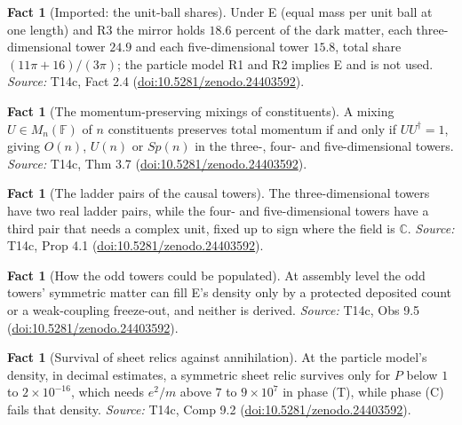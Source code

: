 \documentclass[11pt]{article}
\theoremstyle{definition}
\newtheorem{fact}[theorem]{Fact}
\theoremstyle{plain}
\providecommand{\C}{}\renewcommand{\C}{\mathbb{C}}
\providecommand{\F}{}\renewcommand{\F}{\mathbb{F}}
\begin{document}
\begin{fact}[Imported: the unit-ball shares]\label{c:dark-tower-matter.imported-unit-ball-rule}
Under E (equal mass per unit ball at one length) and R3 the mirror holds $18.6$ percent of the dark matter, each three-dimensional tower $24.9$ and each five-dimensional tower $15.8$, total share $(11\pi + 16)/(3\pi)$; the particle model R1 and R2 implies E and is not used.
\emph{Source:} T14c, Fact 2.4 (\href{https://doi.org/10.5281/zenodo.24403592}{doi:10.5281/zenodo.24403592}).
\end{fact}

\begin{fact}[The momentum-preserving mixings of constituents]\label{c:dark-tower-matter.ladder}
A mixing $U \in M_n(\F)$ of $n$ constituents preserves total momentum if and only if $UU^\dagger = 1$, giving $O(n)$, $U(n)$ or $Sp(n)$ in the three-, four- and five-dimensional towers.
\emph{Source:} T14c, Thm 3.7 (\href{https://doi.org/10.5281/zenodo.24403592}{doi:10.5281/zenodo.24403592}).
\end{fact}

\begin{fact}[The ladder pairs of the causal towers]\label{c:dark-tower-matter.pairs}
The three-dimensional towers have two real ladder pairs, while the four- and five-dimensional towers have a third pair that needs a complex unit, fixed up to sign where the field is $\C$.
\emph{Source:} T14c, Prop 4.1 (\href{https://doi.org/10.5281/zenodo.24403592}{doi:10.5281/zenodo.24403592}).
\end{fact}

\begin{fact}[How the odd towers could be populated]\label{c:dark-tower-matter.population}
At assembly level the odd towers' symmetric matter can fill E's density only by a protected deposited count or a weak-coupling freeze-out, and neither is derived.
\emph{Source:} T14c, Obs 9.5 (\href{https://doi.org/10.5281/zenodo.24403592}{doi:10.5281/zenodo.24403592}).
\end{fact}

\begin{fact}[Survival of sheet relics against annihilation]\label{c:dark-tower-matter.survival-sheets}
At the particle model's density, in decimal estimates, a symmetric sheet relic survives only for $P$ below $1$ to $2 \times 10^{-16}$, which needs $e^2/m$ above $7$ to $9 \times 10^7$ in phase (T), while phase (C) fails that density.
\emph{Source:} T14c, Comp 9.2 (\href{https://doi.org/10.5281/zenodo.24403592}{doi:10.5281/zenodo.24403592}).
\end{fact}
\end{document}
